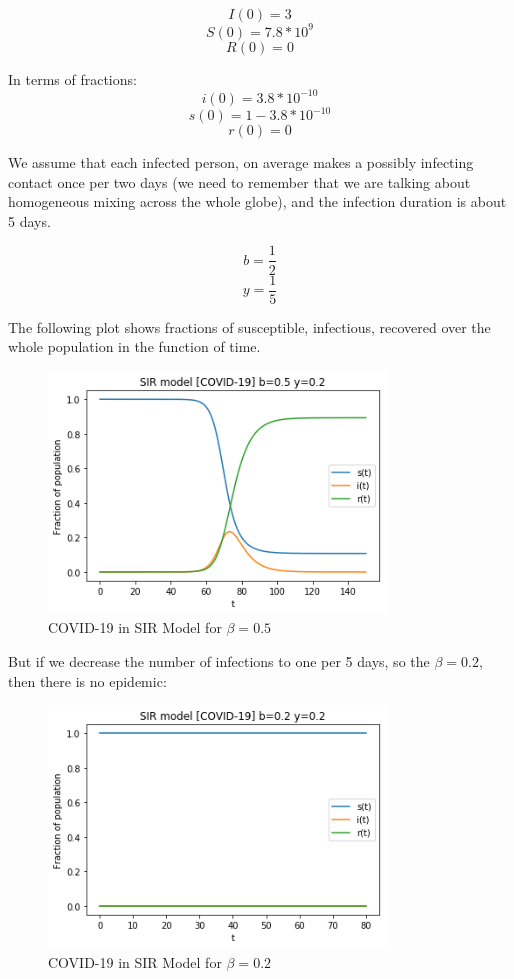\documentclass[nostrict]{szablonPG}
\begin{document}
\[I(0) = 3\]
\[S(0) = 7.8 * 10^9\]
\[R(0) = 0\]

In terms of fractions:
\[i(0) = 3.8 * 10^{-10}\]
\[s(0) = 1 - 3.8 * 10^{-10}\]
\[r(0) = 0\]

We assume that each infected person, on average makes a possibly infecting contact once per two days (we need to remember that we are talking about homogeneous mixing across the whole globe), and the infection duration is about 5 days. 

\[b = \frac{1}{2}\]
\[y = \frac{1}{5}\]

The following plot shows fractions of susceptible, infectious, recovered over the whole population in the function of time.

\begin{figure}[ht]
\includegraphics[width=9cm]{img/covidb12y15.png}
\centering
\caption{COVID-19 in SIR Model for $\beta=0.5$}
\label{fig:covid1}
\end{figure} 


But if we decrease the number of infections to one per 5 days, so the $\beta = 0.2$, then there is no epidemic:

\begin{figure}[ht]
    \includegraphics[width=9cm]{img/covidb15y15.png}
    \centering
    \caption{COVID-19 in SIR Model for $\beta=0.2$}
    \label{fig:covid3}
\end{figure} 
\end{document}
